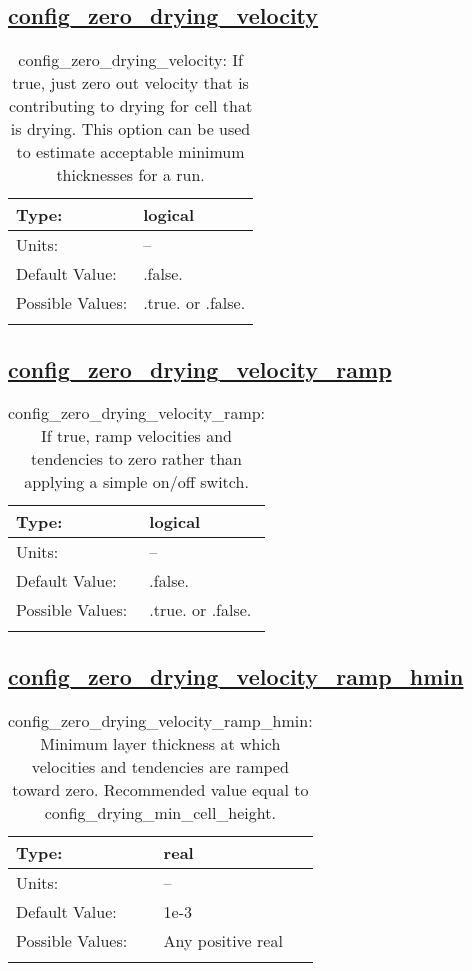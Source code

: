 \subsection[config\_zero\_drying\_velocity]{\hyperref[sec:nm_tab_wetting_drying]{config\_zero\_drying\_velocity}}
\label{subsec:nm_sec_config_zero_drying_velocity}
\begin{center}
\begin{longtable}{| p{2.0in} || p{4.0in} |}
    \hline
    Type: & logical \\
    \hline
    Units: & -- \\
    \hline
    Default Value: & .false. \\
    \hline
    Possible Values: & .true. or .false. \\
    \hline
    \caption{config\_zero\_drying\_velocity: If true, just zero out velocity that is contributing to drying for cell that is drying.  This option can be used to estimate acceptable minimum thicknesses for a run.}
\end{longtable}
\end{center}
\subsection[config\_zero\_drying\_velocity\_ramp]{\hyperref[sec:nm_tab_wetting_drying]{config\_zero\_drying\_velocity\_ramp}}
\label{subsec:nm_sec_config_zero_drying_velocity_ramp}
\begin{center}
\begin{longtable}{| p{2.0in} || p{4.0in} |}
    \hline
    Type: & logical \\
    \hline
    Units: & -- \\
    \hline
    Default Value: & .false. \\
    \hline
    Possible Values: & .true. or .false. \\
    \hline
    \caption{config\_zero\_drying\_velocity\_ramp: If true, ramp velocities and tendencies to zero rather than applying a simple on/off switch.}
\end{longtable}
\end{center}
\subsection[config\_zero\_drying\_velocity\_ramp\_hmin]{\hyperref[sec:nm_tab_wetting_drying]{config\_zero\_drying\_velocity\_ramp\_hmin}}
\label{subsec:nm_sec_config_zero_drying_velocity_ramp_hmin}
\begin{center}
\begin{longtable}{| p{2.0in} || p{4.0in} |}
    \hline
    Type: & real \\
    \hline
    Units: & -- \\
    \hline
    Default Value: & 1e-3 \\
    \hline
    Possible Values: & Any positive real \\
    \hline
    \caption{config\_zero\_drying\_velocity\_ramp\_hmin: Minimum layer thickness at which velocities and tendencies are ramped toward zero. Recommended value equal to config\_drying\_min\_cell\_height.}
\end{longtable}
\end{center}
